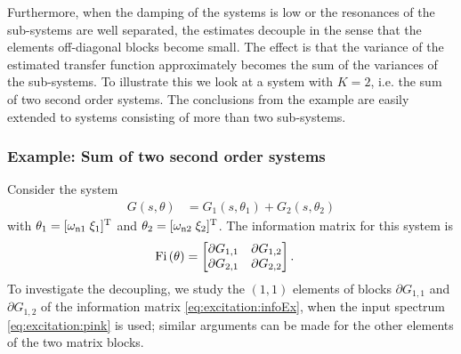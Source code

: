Furthermore, when the damping of the systems is low or the resonances of the sub-systems are well separated, the estimates decouple in the sense that the elements off-diagonal blocks become small.
The effect is that the variance of the estimated transfer function approximately becomes the sum of the variances of the sub-systems.
To illustrate this we look at a system with $K=2$, i.e. the sum of two second order systems.
The conclusions from the example are easily extended to systems consisting of more than two sub-systems.

\subsubsection{Example: Sum of two second order systems}
Consider the system
\begin{align}
G(s,\theta) &= G_1(s,\theta_1) + G_2(s,\theta_2)%
\end{align}
with $\theta_1=[\wn[1]\;\damping_1]^{\T}$ and $\theta_2=[\wn[2]\;\damping_2]^{\T}$.
The information matrix for this system is
\begin{align}
\IF &=
       \begin{bmatrix}
         \partial G_{1,1}  & \partial G_{1,2}\\
         \partial G_{2,1}  & \partial G_{2,2}
       \end{bmatrix}.
\label{eq:excitation:infoEx}
\end{align}
To investigate the decoupling, we study the $(1,1)$ elements of blocks $\partial G_{1,1}$ and $\partial G_{1,2}$ of the information matrix \eqref{eq:excitation:infoEx}, when the input spectrum \eqref{eq:excitation:pink} is used; similar arguments can be made for the other elements of the two matrix blocks.

